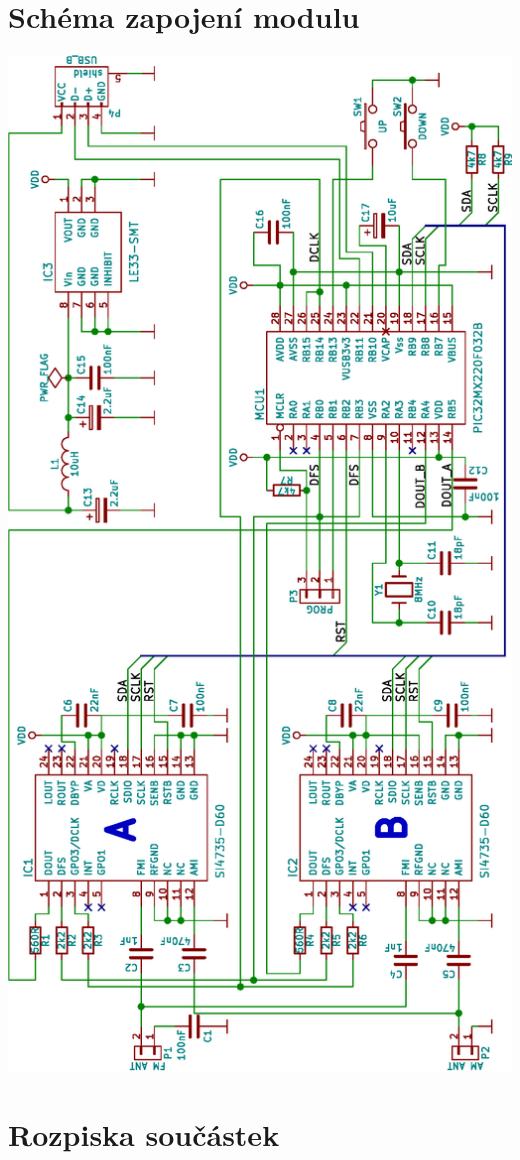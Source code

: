 \documentclass[bc,male,c,dept460]{diploma}						%
\begin{document}
\appendix


\section{Schéma zapojení modulu}


\begin{center}
 \includegraphics[scale=0.78]{figures/dfmt.eps}
\end{center}
 
\section{Rozpiska součástek}


\clearpage

\end{document}
